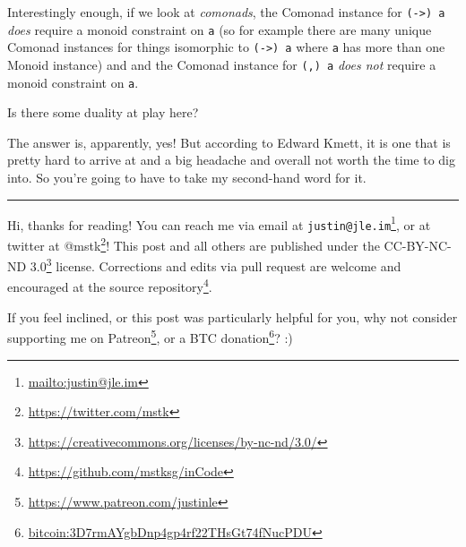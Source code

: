 \documentclass[]{article}
\renewcommand{\href}[2]{#2\footnote{\url{#1}}}
\begin{document}
Interestingly enough, if we look at \emph{comonads}, the Comonad instance for
\texttt{(-\textgreater{})\ a} \emph{does} require a monoid constraint on
\texttt{a} (so for example there are many unique Comonad instances for things
isomorphic to \texttt{(-\textgreater{})\ a} where \texttt{a} has more than one
Monoid instance) and and the Comonad instance for \texttt{(,)\ a} \emph{does
not} require a monoid constraint on \texttt{a}.

Is there some duality at play here?

The answer is, apparently, yes! But according to Edward Kmett, it is one that is
pretty hard to arrive at and a big headache and overall not worth the time to
dig into. So you're going to have to take my second-hand word for it.

\begin{center}\rule{0.5\linewidth}{\linethickness}\end{center}

Hi, thanks for reading! You can reach me via email at
\href{mailto:justin@jle.im}{\nolinkurl{justin@jle.im}}, or at twitter at
\href{https://twitter.com/mstk}{@mstk}! This post and all others are published
under the \href{https://creativecommons.org/licenses/by-nc-nd/3.0/}{CC-BY-NC-ND
3.0} license. Corrections and edits via pull request are welcome and encouraged
at \href{https://github.com/mstksg/inCode}{the source repository}.

If you feel inclined, or this post was particularly helpful for you, why not
consider \href{https://www.patreon.com/justinle}{supporting me on Patreon}, or a
\href{bitcoin:3D7rmAYgbDnp4gp4rf22THsGt74fNucPDU}{BTC donation}? :)
\end{document}
